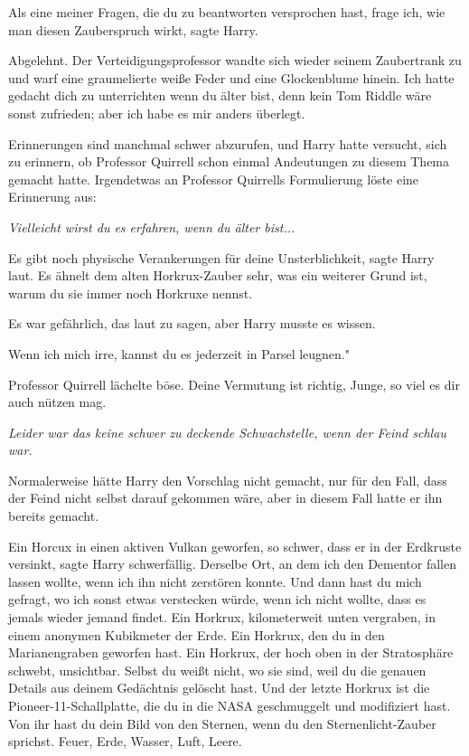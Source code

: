 \glqq Als eine meiner Fragen, die du zu beantworten versprochen hast, frage ich,
wie man diesen Zauberspruch wirkt\grqq{}, sagte Harry.

\glqq Abgelehnt.\grqq{} Der Verteidigungsprofessor wandte sich wieder seinem
Zaubertrank zu und warf eine graumelierte weiße Feder und eine Glockenblume
hinein. \glqq Ich hatte gedacht dich zu unterrichten wenn du älter bist, denn
kein Tom Riddle wäre sonst zufrieden; aber ich habe es mir anders
überlegt.\grqq{}

Erinnerungen sind manchmal schwer abzurufen, und Harry hatte versucht, sich zu
erinnern, ob Professor Quirrell schon einmal Andeutungen zu diesem Thema gemacht
hatte. Irgendetwas an Professor Quirrells Formulierung löste eine Erinnerung
aus:

\emph{Vielleicht wirst du es erfahren, wenn du älter bist... }

\glqq Es gibt noch physische Verankerungen für deine Unsterblichkeit\grqq{},
sagte Harry laut. \glqq Es ähnelt dem alten Horkrux-Zauber sehr, was ein
weiterer Grund ist, warum du sie immer noch Horkruxe nennst.\grqq{}

Es war gefährlich, das laut zu sagen, aber Harry musste es wissen.

\glqq Wenn ich mich irre, kannst du es jederzeit in Parsel leugnen."

Professor Quirrell lächelte böse. \glqq Deine Vermutung ist richtig, Junge, so
viel es dir auch nützen mag.\grqq{}

\emph{Leider war das keine schwer zu deckende Schwachstelle, wenn der Feind schlau war.}

Normalerweise hätte Harry den Vorschlag nicht gemacht, nur für den Fall, dass
der Feind nicht selbst darauf gekommen wäre, aber in diesem Fall hatte er ihn
bereits gemacht.

\glqq Ein Horcux in einen aktiven Vulkan geworfen, so schwer, dass er in der
Erdkruste versinkt\grqq{}, sagte Harry schwerfällig. \glqq Derselbe Ort, an dem
ich den Dementor fallen lassen wollte, wenn ich ihn nicht zerstören konnte. Und
dann hast du mich gefragt, wo ich sonst etwas verstecken würde, wenn ich nicht
wollte, dass es jemals wieder jemand findet. Ein Horkrux, kilometerweit unten
vergraben, in einem anonymen Kubikmeter der Erde. Ein Horkrux, den du in den
Marianengraben geworfen hast. Ein Horkrux, der hoch oben in der Stratosphäre
schwebt, unsichtbar. Selbst du weißt nicht, wo sie sind, weil du die genauen
Details aus deinem Gedächtnis gelöscht hast. Und der letzte Horkrux ist die
Pioneer-11-Schallplatte, die du in die NASA geschmuggelt und modifiziert hast.
Von ihr hast du dein Bild von den Sternen, wenn du den Sternenlicht-Zauber
sprichst. Feuer, Erde, Wasser, Luft, Leere.\grqq{}

